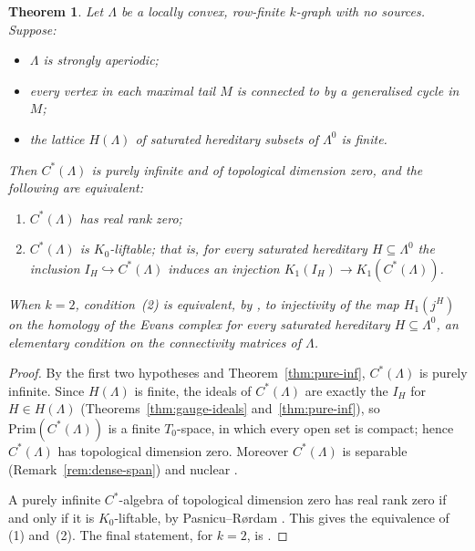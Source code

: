 \documentclass[12pt]{amsart}
\theoremstyle{plain}
\newtheorem{theorem}{Theorem}[section]
\theoremstyle{definition}
\theoremstyle{remark}
\begin{document}
\begin{theorem}\label{thm:RR0-finite-H}
Let $\Lambda$ be a locally convex, row-finite $k$-graph with no sources.
Suppose:
\begin{itemize}
  \item $\Lambda$ is strongly aperiodic;
  \item every vertex in each maximal tail $M$ is connected to by a
        generalised cycle in $M$;
  \item the lattice $H(\Lambda)$ of saturated hereditary subsets of
        $\Lambda^0$ is finite.
\end{itemize}
Then $C^*(\Lambda)$ is purely infinite and of topological dimension zero,
and the following are equivalent:
\begin{enumerate}
  \item $C^*(\Lambda)$ has real rank zero;
  \item $C^*(\Lambda)$ is $K_0$-liftable; that is, for every saturated
        hereditary $H\subseteq\Lambda^0$ the inclusion
        $I_H\hookrightarrow C^*(\Lambda)$ induces an injection
        $K_1(I_H)\to K_1(C^*(\Lambda))$.
\end{enumerate}
When $k=2$, condition~(2) is equivalent, by
\cite[Lemma~4.7 and Proposition~4.4]{PSS2}, to injectivity of the map
$H_1(j^H)$ on the homology of the Evans complex for every saturated
hereditary $H\subseteq\Lambda^0$, an elementary condition on the
connectivity matrices of $\Lambda$.
\end{theorem}

\begin{proof}
By the first two hypotheses and Theorem~\ref{thm:pure-inf}, $C^*(\Lambda)$ is
purely infinite. Since $H(\Lambda)$ is finite, the ideals of $C^*(\Lambda)$
are exactly the $I_H$ for $H\in H(\Lambda)$ (Theorems~\ref{thm:gauge-ideals}
and~\ref{thm:pure-inf}), so $\mathrm{Prim}(C^*(\Lambda))$ is a finite
$T_0$-space, in which every open set is compact; hence $C^*(\Lambda)$ has
topological dimension zero. Moreover $C^*(\Lambda)$ is separable
(Remark~\ref{rem:dense-span}) and nuclear \cite{KP2,S}.

A purely infinite $C^*$-algebra of topological dimension zero has real rank
zero if and only if it is $K_0$-liftable, by Pasnicu--R{\o}rdam
\cite[Theorem~4.2]{PR}. This gives the equivalence of (1) and~(2). The final
statement, for $k=2$, is \cite[Lemma~4.7 and Proposition~4.4]{PSS2}.
\end{proof}
\end{document}
